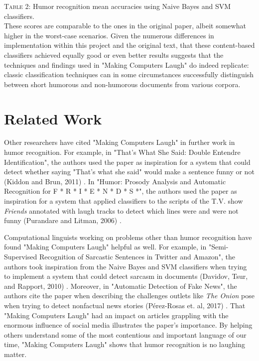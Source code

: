 \documentclass[11pt,a4paper]{article}
\begin{document}
\noindent \textsc{Table 2}: Humor recognition mean accuracies using Naive Bayes and SVM classifiers.\\

These scores are comparable to the ones in the original paper, albeit somewhat higher in the worst-case scenarios. Given the numerous differences in implementation within this project and the original text, that these content-based classifiers achieved equally good or even better results suggests that the techniques and findings used in "Making Computers Laugh" do indeed replicate: classic classification techniques can in some circumstances successfully distinguish between short humorous and non-humorous documents from various corpora.

\section{Related Work}

Other researchers have cited "Making Computers Laugh" in further work in humor recognition. For example, in "That's What She Said: Double Entendre Identification", the authors used the paper as inspiration for a system that could detect whether saying "That's what she said" would make a sentence funny or not (Kiddon and Brun, 2011) \cite{kiddon2011s}. In "Humor: Prosody Analysis and Automatic Recognition for F * R * I * E * N * D * S *", the authors used the paper as inspiration for a system that applied classifiers to the scripts of the T.V. show \emph{Friends} annotated with laugh tracks to detect which lines were and were not funny (Purandare and Litman, 2006) \cite{purandare2006humor}.

Computational linguists working on problems other than humor recognition have found "Making Computers Laugh" helpful as well. For example, in "Semi-Supervised Recognition of Sarcastic Sentences in Twitter and Amazon", the authors took inspiration from the Naive Bayes and SVM classifiers when trying to implement a system that could detect sarcasm in documents (Davidov, Tsur, and Rapport, 2010) \cite{davidov2010semi}. Moreover, in "Automatic Detection of Fake News", the authors cite the paper when describing the challenges outlets like \emph{The Onion} pose when trying to detect nonfactual news stories (P{\'e}rez-Rosas et. al, 2017) \cite{perez2017automatic}. That "Making Computers Laugh" had an impact on articles grappling with the enormous influence of social media illustrates the paper's importance. By helping others understand some of the most contentious and important language of our time, "Making Computers Laugh" shows that humor recognition is no laughing matter.



\end{document}
